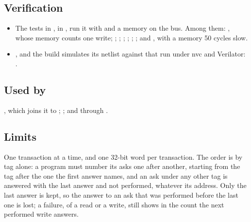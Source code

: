 \subsection*{Verification}

\begin{itemize}
\item The tests in , in
, run it with  and a
memory on the bus. Among them:
,
whose memory counts one write;
;
;
;
;
;
; and
, with a memory 50 cycles slow.
\item {}, and the build simulates its
netlist against that run under nvc and Verilator:\newline
{}\newline
{}.
\end{itemize}

\subsection*{Used by}

, which joins it to ; ;
and  through .

\subsection*{Limits}

One transaction at a time, and one 32-bit word per transaction. The
order is by tag alone: a program must number its asks one after
another, starting from the tag after the one the first answer names,
and an ask under any other tag is answered with the last answer and not
performed, whatever its address. Only the last answer is kept, so the
answer to an ask that was performed before the last one is lost; a
failure, of a read or a write, still shows in the count the next
performed write answers.
